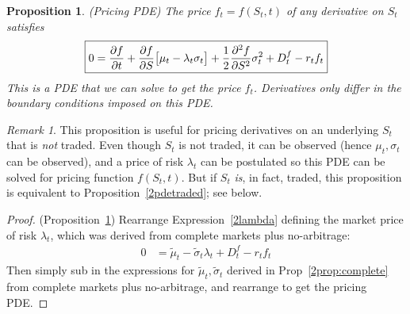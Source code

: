 \documentclass[12pt]{article}
\theoremstyle{plain}
\newtheorem{prop}[thm]{Proposition}
\theoremstyle{definition}
\theoremstyle{remark}
\newtheorem*{rmk}{Remark}
\begin{document}
\begin{prop}\emph{(Pricing PDE)}
\label{2pdenontraded}
The price $f_{t}=f(S_t,t)$ of any derivative on $S_t$ satisfies
\begin{align*}
  \boxed{%
    0
    =
    \frac{\partial f}{\partial t}
    +
    \frac{\partial f}{\partial S}
    \big[
    \mu_t
    -
    \lambda_t
    \sigma_t
    \big]
    +
    \frac{1}{2}
    \frac{\partial^2 f}{\partial S^2}
    \sigma_t^2
    + D_t^f - r_tf_t
  }
\end{align*}
This is a PDE that we can solve to get the price $f_{t}$.
Derivatives only differ in the boundary conditions imposed on this PDE.
\end{prop}
\begin{rmk}
This proposition is useful for pricing derivatives on an underlying
$S_t$ that is \emph{not} traded. Even though $S_t$ is not traded, it can
be observed (hence $\mu_t,\sigma_t$ can be observed), and a price of
risk $\lambda_t$ can be postulated so this PDE can be solved for pricing
function $f(S_t,t)$.
But if $S_t$ \emph{is}, in fact, traded, this proposition is equivalent
to Proposition~\ref{2pdetraded}; see below.
\end{rmk}
\begin{proof}(Proposition~\ref{2pdenontraded})
Rearrange Expression~\ref{2lambda} defining the market price of risk
$\lambda_t$, which was derived from complete markets plus no-arbitrage:
\begin{align*}
  0
  &=
  \tilde{\mu}_t
  - \tilde{\sigma}_t\lambda_t
  + D_t^f - r_tf_t
\end{align*}
Then simply sub in the expressions for $\tilde{\mu}_t,\tilde{\sigma}_t$
derived in Prop~\ref{2prop:complete} from complete markets plus
no-arbitrage, and rearrange to get the pricing PDE.
\end{proof}
\end{document}
